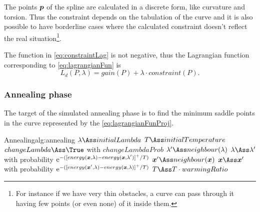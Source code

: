 \documentclass[dissertation.tex]{subfiles}
\begin{document}
The points $\boldsymbol{p}$ of the spline are calculated in a discrete
form, like curvature and torsion. Thus the constraint depends on the
tabulation of the curve and
it is also possible to have borderline cases where the calculated
constraint doesn't reflect the real situation\footnote{For instance if
  we have very thin obstacles, a curve can pass through it having few
  points (or even none) of it inside them.}.

The
function in \cref{eq:constraintLag} is not negative, thus the
Lagrangian function corresponding to 
\cref{eq:lagrangianFun} is
\begin{equation}\label{eq:lagrangianFunProj}
    L_d(P,\lambda)=gain(P)+\lambda\cdot constraint(P).
\end{equation}

\subsubsection{Annealing phase}
The target of the simulated annealing phase is to find the minimum
saddle points in
the curve represented by the
\cref{eq:lagrangianFunProj}.
\begin{algo}{Annealing}{alg:annealing}
  \State $\lambda\Ass initialLambda$\label{alg:annealing:initialize}
  \State $T\Ass initialTemperature$
  \label{alg:annealing:while}
  \label{alg:annealing:for}
  \State $changeLambda\Ass\True$ with $changeLambdaProb$\label{alg:annealing:lambdaProb}
  \State $\lambda'\Ass neighbour(\lambda)$\label{alg:annealing:changeLambda}
  \State $\lambda\Ass \lambda'$ with probability $\mathrm{e}^{-([energy(\boldsymbol{x},\lambda)-energy(\boldsymbol{x},\lambda')]^+/T)}$
  \Else
  \State $\ve{x}'\Ass neighbour(\ve{x})$\label{alg:annealing:changeX}
  \State $\ve{x}\Ass \ve{x}'$ with probability $\mathrm{e}^{-([energy(\boldsymbol{x}',\lambda)-energy(\boldsymbol{x},\lambda)]^+/T)}$
  \EndIf
  \EndFor
  \State $T\Ass T\cdot warmingRatio$\label{alg:annealing:cooling}
  \EndWhile
  \EndProcedure
\end{algo}
\end{document}
